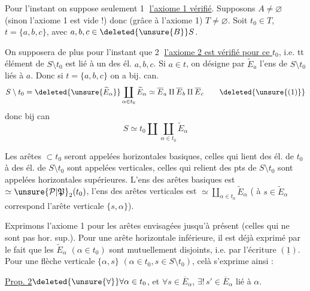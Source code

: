 Pour l'instant on suppose seulement \textcircled{1} \uline{l'axiome 1 vérifié}. Supposons $A\ne\varnothing$ (sinon l'axiome 1 est vide !) donc (grâce à l'axiome 1) $T\ne\varnothing$. Soit $t_0\in T$,  $t=\{a,b,c\}$, avec $a,b,c\in \deleted{\unsure{B}}S$.

On supposera de plus pour l'instant que \textcircled{2} \uline{l'axiome 2 est vérifié pour ce $t_0$}, i.e. tt élément de $S\setminus t_0$ est lié à un des él. $a,b,c$. Si $a\in t$, on désigne par $\widetilde E_a$ l'ens de $S\setminus t_0$ liés à $a$. Donc si $t=\{a,b,c\}$ on a bij. can.
\[
S\setminus t_0=\deleted{\unsure{\widetilde E_\alpha}}\coprod_{\alpha\in t_0}\widetilde E_\alpha
\simeq\overline E_a\amalg\overline E_b\amalg\overline E_c
\tag*{\deleted{\unsure{(1)}}}
\]
donc bij can
\[
S\simeq t_0\amalg\coprod_{\alpha\in t_0}\widetilde E_\alpha
\tag*{(1)}
\]


Les arêtes $\subset t_0$ seront appelées horizontales basiques, celles qui lient des él. de $t_0$ à des él. de $S\setminus t_0$ sont appelées verticales, celles qui relient des pts de $S\setminus t_0$ sont appelées horizontales supérieures.  L'ens des  arêtes basiques est $\simeq\unsure{\mathcal P|\mathfrak P}_2(t_0)$, l'ens des arêtes verticales est $\simeq\coprod_{\alpha\in t_0}\widetilde E_\alpha$ ( à $s\in\widetilde E_\alpha$ correspond l'arête verticale $\{s,\alpha\}$).

Exprimons l'axiome 1 pour les arêtes envisagées jusqu'à présent (celles qui ne sont pas hor. sup.). Pour une arête horizontale inférieure, il est déjà exprimé par le fait que les $\widetilde E_\alpha$ $(\alpha\in t_0)$ sont mutuellement disjoints, i.e. par l'écriture $(\underline{1})$. Pour une flèche verticale $\{\alpha,s\}$ $(\alpha\in t_0,s\in S\setminus t_0)$, celà s'exprime ainsi :

\noindent\vrule\hspace{.5em}\begin{minipage}{.89\linewidth}\uline{Prop. 2}\quad $\deleted{\unsure{\forall}}\forall\alpha\in t_0$, et $\forall s\in\overline E_\alpha$, $\exists!\,s'\in\overline E_\alpha$ lié à $\alpha$.\end{minipage}

